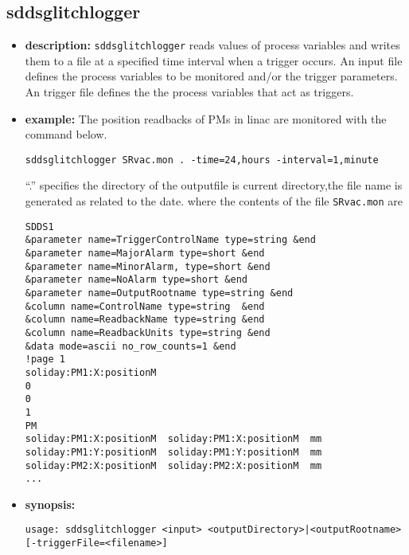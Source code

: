 %
%
\begin{latexonly}
\newpage
\end{latexonly}

%
%
\subsection{sddsglitchlogger}
\label{sddsglitchlogger}

\begin{itemize}
\item {\bf description:}
%
%
\verb+sddsglitchlogger+ reads values of process variables and writes them to a file at a specified time interval when a trigger occurs.
An input file defines the process variables to be monitored and/or the trigger parameters.
An trigger file defines the the process variables that act as triggers.
\item {\bf example:} 
%
% 
%
The position readbacks of PMs in linac are monitored with the command below.
\begin{verbatim}
sddsglitchlogger SRvac.mon . -time=24,hours -interval=1,minute
\end{verbatim}
``.'' specifies the directory of the outputfile is current directory,the file name is generated
as related to the date.
where the contents of the file \verb+SRvac.mon+ are
\begin{verbatim}
SDDS1
&parameter name=TriggerControlName type=string &end
&parameter name=MajorAlarm type=short &end
&parameter name=MinorAlarm, type=short &end
&parameter name=NoAlarm type=short &end
&parameter name=OutputRootname type=string &end
&column name=ControlName type=string  &end
&column name=ReadbackName type=string &end
&column name=ReadbackUnits type=string &end
&data mode=ascii no_row_counts=1 &end
!page 1
soliday:PM1:X:positionM
0
0
1
PM
soliday:PM1:X:positionM  soliday:PM1:X:positionM  mm
soliday:PM1:Y:positionM  soliday:PM1:Y:positionM  mm
soliday:PM2:X:positionM  soliday:PM2:X:positionM  mm
...
\end{verbatim}
\item {\bf synopsis:} 
%
%
\begin{verbatim}
usage: sddsglitchlogger <input> <outputDirectory>|<outputRootname> [-triggerFile=<filename>]

\end{verbatim}
\end{itemize}
